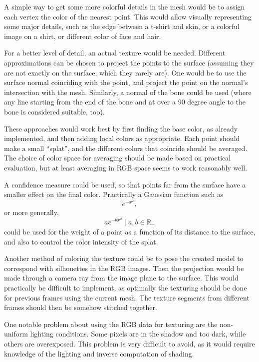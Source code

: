 A simple way to get some more colorful details in the mesh would be to assign each vertex the color of the nearest point. This would allow visually representing some major details, such as the edge between a t-shirt and skin, or a colorful image on a shirt, or different color of face and hair.

For a better level of detail, an actual texture would be needed. Different approximations can be chosen to project the points to the surface (assuming they are not exactly on the surface, which they rarely are). One would be to use the surface normal coinciding with the point, and project the point on the normal's intersection with the mesh. Similarly, a normal of the bone could be used (where any line starting from the end of the bone and at over a 90 degree angle to the bone is considered suitable, too).

These approaches would work best by first finding the base color, as already implemented, and then adding local colors as appropriate. Each point should make a small ``splat'', and the different colors that coincide should be averaged. The choice of color space for averaging should be made based on practical evaluation, but at least averaging in RGB space seems to work reasonably well.

A confidence measure could be used, so that points far from the surface have a smaller effect on the final color. Practically a Gaussian function such as
\begin{equation*}
    e^{-x^2},
\end{equation*}
or more generally,
\begin{equation*}
    a e^{-b x^2} \mid a, b \in \mathbb{R}_+
\end{equation*}
could be used for the weight of a point as a function of its distance to the surface, and also to control the color intensity of the splat.

Another method of coloring the texture could be to pose the created model to correspond with silhouettes in the RGB images. Then the projection would be made through a camera ray from the image plane to the surface. This would practically be difficult to implement, as optimally the texturing should be done for previous frames using the current mesh. The texture segments from different frames should then be somehow stitched together.

One notable problem about using the RGB data for texturing are the non-uniform lighting conditions. Some pixels are in the shadow and too dark, while others are overexposed. This problem is very difficult to avoid, as it would require knowledge of the lighting and inverse computation of shading.

